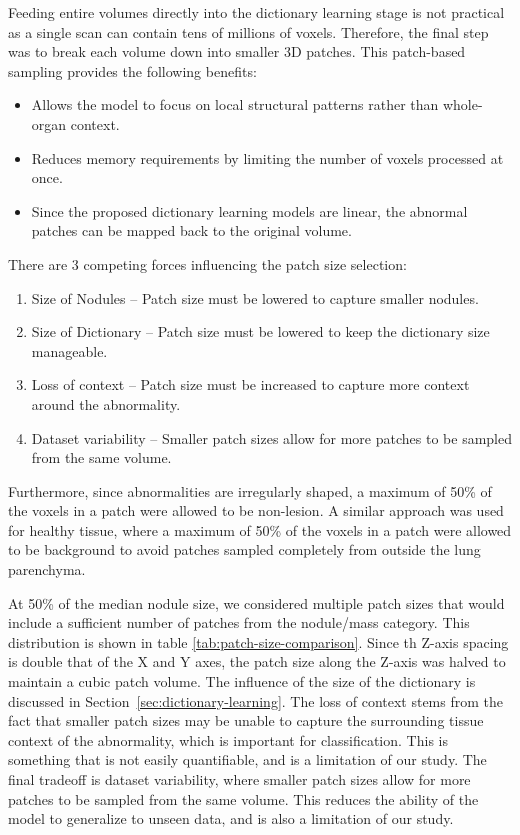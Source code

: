 Feeding entire volumes directly into the dictionary learning stage is not practical as a single scan can
contain tens of millions of voxels. Therefore, the final step was
to break each volume down into smaller 3D patches. This patch-based sampling provides the following benefits:

\begin{itemize}
    \item Allows the model to focus on local structural patterns rather than whole-organ context.
    \item Reduces memory requirements by limiting the number of voxels processed at once.
    \item Since the proposed dictionary learning models are linear, the abnormal patches can be mapped back to the original volume.
\end{itemize}

\noindent There are 3 competing forces influencing the patch size selection:
\begin{enumerate}
    \item Size of Nodules -- Patch size must be lowered to capture smaller nodules.
    \item Size of Dictionary -- Patch size must be lowered to keep the dictionary size manageable.
    \item Loss of context -- Patch size must be increased to capture more context around the abnormality.
    \item Dataset variability -- Smaller patch sizes allow for more patches to be sampled from the same volume.
\end{enumerate}

Furthermore, since abnormalities are irregularly shaped, a maximum of 50\% of the voxels in a patch were allowed to be non-lesion.
A similar approach was used for healthy tissue, where a maximum of 50\% of the voxels in a patch were allowed to be background
to avoid patches sampled completely from outside the lung parenchyma.

At 50\% of the median nodule size, we considered multiple patch sizes that would include a sufficient number of 
patches from the nodule/mass category. This distribution is shown in table \ref{tab:patch-size-comparison}.
Since th Z-axis spacing is double that of the X and Y axes, the patch size along the Z-axis was halved to maintain a cubic patch
volume. The influence of the size of the dictionary is discussed in Section~\ref{sec:dictionary-learning}.
The loss of context stems from the fact that smaller patch sizes may be unable to capture the surrounding tissue context of the
abnormality, which is important for classification. This is something that is not easily quantifiable, and is a limitation of our study.
The final tradeoff is dataset variability, where smaller patch sizes allow for more patches to be sampled from the same volume.
This reduces the ability of the model to generalize to unseen data, and is also a limitation of our study.


